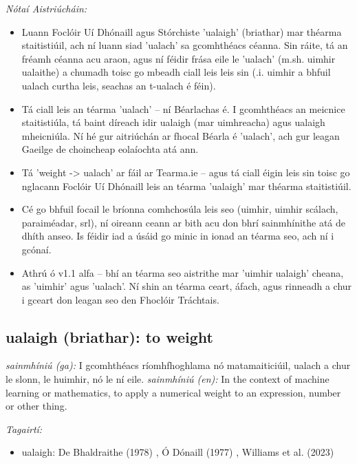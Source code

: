 \documentclass{article}
\begin{document}
 \noindent \textit{Nótaí Aistriúcháin:}
\begin{itemize}
	\item Luann Foclóir Uí Dhónaill agus Stórchiste 'ualaigh' (briathar) mar théarma staitistiúil, ach ní luann siad 'ualach' sa gcomhthéacs céanna. Sin ráite, tá an fréamh céanna acu araon, agus ní féidir frása eile le 'ualach' (m.sh. uimhir ualaithe) a chumadh toisc go mbeadh ciall leis leis sin (.i. uimhir a bhfuil ualach curtha leis, seachas an t-ualach é féin).
	\item Tá ciall leis an téarma 'ualach' -- ní Béarlachas é. I gcomhthéacs an meicnice staitistiúla, tá baint díreach idir ualaigh (mar uimhreacha) agus ualaigh mheicniúla. Ní hé gur aitriúchán ar fhocal Béarla é 'ualach', ach gur leagan Gaeilge de choincheap eolaíochta atá ann.
	\item Tá 'weight -> ualach' ar fáil ar Tearma.ie -- agus tá ciall éigin leis sin toisc go nglacann Foclóir Uí Dhónaill leis an téarma 'ualaigh' mar théarma staitistiúil. 
	\item Cé go bhfuil focail le bríonna comhchosúla leis seo (uimhir, uimhir scálach, paraiméadar, srl), ní oireann ceann ar bith acu don bhrí sainmhínithe atá de dhíth anseo. Is féidir iad a úsáid go minic in ionad an téarma seo, ach ní i gcónaí.
	\item Athrú ó v1.1 alfa -- bhí an téarma seo aistrithe mar 'uimhir ualaigh' cheana, as 'uimhir' agus 'ualach'. Ní shin an téarma ceart, áfach, agus rinneadh a chur i gceart don leagan seo den Fhoclóir Tráchtais.
\end{itemize}


\subsection*{ualaigh (briathar): to weight} 
 \noindent \textit{sainmhíniú (ga):} I gcomhthéacs ríomhfhoghlama nó matamaiticiúil, ualach a chur le slonn, le huimhir, nó le ní eile.
\newline\newline
 \noindent \textit{sainmhíniú (en):} In the context of machine learning or mathematics, to apply a numerical weight to an expression, number or other thing.
\newline

 \noindent \textit{Tagairtí:}
\begin{itemize}
	\item ualaigh: De Bhaldraithe (1978) \cite{de-bhaldraithe}, Ó Dónaill (1977) \cite{odonaill}, Williams et al. (2023) \cite{storchiste}
\end{itemize}
\end{document}
